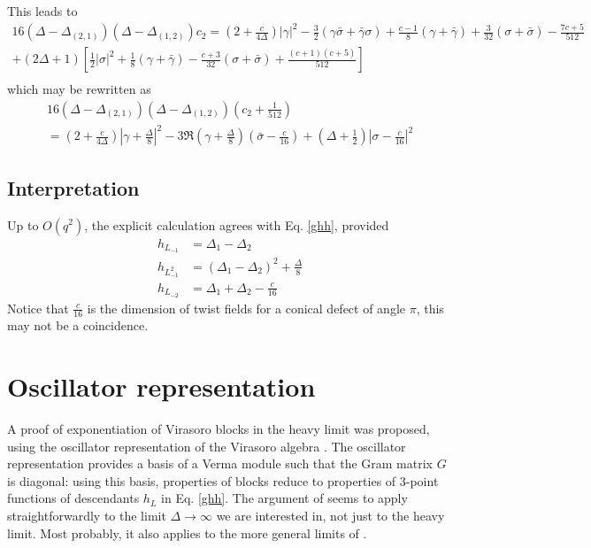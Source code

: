 \documentclass[12pt,a4paper]{article}
\begin{document}
This leads to 
\begin{multline}
 16(\Delta-\Delta_{(2,1)})(\Delta-\Delta_{(1,2)}) c_2 = \left(2+\frac{c}{4\Delta}\right)|\gamma|^2 
 -\tfrac32(\gamma\bar\sigma + \bar\gamma\sigma)+\tfrac{c-1}{8}(\gamma+\bar\gamma)+\tfrac{3}{32}(\sigma+\bar\sigma)-\tfrac{7c+5}{512}
 \\
 + (2\Delta+1)\left[\tfrac12|\sigma|^2 +\tfrac18 (\gamma+\bar\gamma) -\tfrac{c+3}{32}(\sigma+\bar\sigma)+\tfrac{(c+1)(c+5)}{512}\right] \\
\end{multline}
which may be rewritten as 
\begin{multline}
 16(\Delta-\Delta_{(2,1)})(\Delta-\Delta_{(1,2)}) \left(c_2+\tfrac{1}{512}\right) 
 \\
 = \left(2+\frac{c}{4\Delta}\right)\left|\gamma+\tfrac{\Delta}{8}\right|^2 
 -3\Re\left(\gamma+\tfrac{\Delta}{8}\right)\left(\bar\sigma-\tfrac{c}{16}\right)
 +\left(\Delta+\tfrac12\right)\left|\sigma-\tfrac{c}{16}\right|^2 
\end{multline}

\subsection{Interpretation}

Up to $O(q^2)$, the explicit calculation agrees with Eq. \eqref{ghh}, provided
\begin{subequations}
 \label{hl}
\begin{align}
 h_{L_{-1}} &= \Delta_1-\Delta_2
 \\
 h_{L_{-1}^2} &= (\Delta_1-\Delta_2)^2 +\frac{\Delta}{8}
 \\
 h_{L_{-2}} &= \Delta_1+\Delta_2-\frac{c}{16}
\end{align}
\end{subequations}
Notice that $\frac{c}{16}$ is the dimension of twist fields for a conical defect of angle $\pi$, this may not be a coincidence. 

\section{Oscillator representation}

A proof of exponentiation of Virasoro blocks in the heavy limit was proposed, using the oscillator representation of the Virasoro algebra \cite{bdk19}. The oscillator representation provides a basis of a Verma module such that the Gram matrix $G$ is diagonal: using this basis, properties of blocks reduce to properties of 3-point functions of descendants $h_L$ in Eq. \eqref{ghh}. The argument of \cite{bdk19} seems to apply straightforwardly to the limit $\Delta\to\infty$ we are interested in, not just to the heavy limit. Most probably, it also applies to the more general limits of \cite{al24}. 
\end{document}
